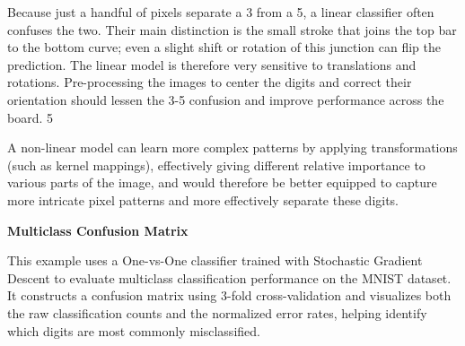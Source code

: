 \documentclass[12pt,letter]{article}
\begin{document}
Because just a handful of pixels separate a 3 from a 5, a linear classifier often confuses the two. Their main distinction is the small stroke that joins the top bar to the bottom curve; even a slight shift or rotation of this junction can flip the prediction. The linear model is therefore very sensitive to translations and rotations. Pre-processing the images to center the digits and correct their orientation should lessen the 3-5 confusion and improve performance across the board.
5 

A non-linear model can learn more complex patterns by applying transformations (such as kernel mappings), effectively giving different relative importance to various parts of the image, and would therefore be better equipped to  capture more intricate pixel patterns and more effectively separate these digits.






\begin{example}
\textbf{Multiclass Confusion Matrix}

\noindent This example uses a One-vs-One classifier trained with Stochastic Gradient Descent to evaluate multiclass classification performance on the MNIST dataset. It constructs a confusion matrix using 3-fold cross-validation and visualizes both the raw classification counts and the normalized error rates, helping identify which digits are most commonly misclassified.
\end{example}

\pagebreak




\end{document}
